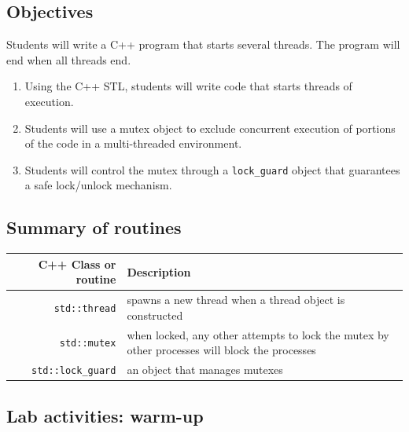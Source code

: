 \documentclass[12pt]{book}
\begin{document}
\subsection{Objectives}

Students will write a C++ program that starts several threads. The program will end when all threads end.

\begin{enumerate}[label=Objective \arabic*]
\item\label{thread.start} Using the C++ STL, students will write code that starts threads of execution.
\item\label{mutex} Students will use a mutex object to exclude concurrent execution of portions of the code in a multi-threaded environment.
\item\label{lock.guard} Students will control the mutex through a \lstinline$lock_guard$ object that guarantees a safe lock/unlock mechanism.
\end{enumerate}


\subsection{Summary of routines}

\begin{tabularx}{\textwidth}{r  X}
  C++ Class or routine & Description \\ \midrule
  \lstinline$std::thread$ & spawns a new thread when a thread object is constructed  \\
  \lstinline$std::mutex$ & when locked, any other attempts to lock the mutex by other processes will block the processes \\
  \lstinline$std::lock_guard$ & an object that manages mutexes
\end{tabularx}

\subsection{Lab activities: warm-up}
\end{document}
